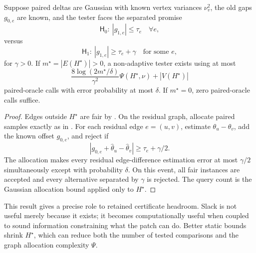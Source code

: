 \begin{corollary}
\label{arch:cor:envelope-gaussian}
Suppose paired deltas are Gaussian with known vertex variances \(\nu_v^2\), the
old gaps \(g_{0,e}\) are known, and the tester faces the separated promise
\begin{equation}\label{eq:appendix-07-regression-consequences-018}
\mathsf H_0:\ |g_{1,e}|\le\tau_e\quad\forall e,
\end{equation}
versus
\begin{equation}\label{eq:appendix-07-regression-consequences-019}
\mathsf H_1:\ |g_{1,e}|\ge\tau_e+\gamma
\quad\text{for some }e,
\end{equation}
for \(\gamma>0\).  If \(m^\star=|E(H^\star)|>0\), a non-adaptive tester exists
using at most
\begin{equation}\label{eq:appendix-07-regression-consequences-020}
\frac{8\log(2m^\star/\delta)}{\gamma^2}
\Psi(H^\star,\nu)
+
|V(H^\star)|
\end{equation}
paired-oracle calls with error probability at most \(\delta\).  If
\(m^\star=0\), zero paired-oracle calls suffice.
\end{corollary}

\begin{proof}
Edges outside \(H^\star\) are fair by
.  On the residual graph, allocate paired samples
exactly as in .  For each residual edge \(e=(u,v)\), estimate
\(\theta_u-\theta_v\), add the known offset \(g_{0,e}\), and reject if
\begin{equation}\label{eq:appendix-07-regression-consequences-021}
|g_{0,e}+\widehat\theta_u-\widehat\theta_v|
\ge
\tau_e+\gamma/2.
\end{equation}
The allocation makes every residual edge-difference estimation error at most
\(\gamma/2\) simultaneously except with probability \(\delta\).  On this event,
all fair instances are accepted and every alternative separated by \(\gamma\) is
rejected.  The query count is the Gaussian allocation bound applied only to
\(H^\star\).
\end{proof}

This result gives a precise role to retained certificate headroom.  Slack is not
useful merely because it exists; it becomes computationally useful when coupled
to sound information constraining what the patch can do.  Better static bounds
shrink \(H^\star\), which can reduce both the number of tested comparisons and
the graph allocation complexity \(\Psi\).
